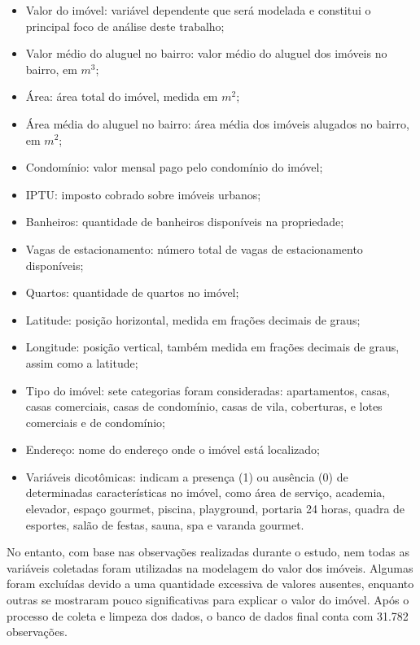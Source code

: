 \documentclass[
  12pt,
  a4paper,
]{scrreprt}
\begin{document}
\begin{itemize}
\item
  Valor do imóvel: variável dependente que será modelada e constitui o
  principal foco de análise deste trabalho;
\item
  Valor médio do aluguel no bairro: valor médio do aluguel dos imóveis
  no bairro, em \(m^3\);
\item
  Área: área total do imóvel, medida em \(m^2\);
\item
  Área média do aluguel no bairro: área média dos imóveis alugados no
  bairro, em \(m^2\);
\item
  Condomínio: valor mensal pago pelo condomínio do imóvel;
\item
  IPTU: imposto cobrado sobre imóveis urbanos;
\item
  Banheiros: quantidade de banheiros disponíveis na propriedade;
\item
  Vagas de estacionamento: número total de vagas de estacionamento
  disponíveis;
\item
  Quartos: quantidade de quartos no imóvel;
\item
  Latitude: posição horizontal, medida em frações decimais de graus;
\item
  Longitude: posição vertical, também medida em frações decimais de
  graus, assim como a latitude;
\item
  Tipo do imóvel: sete categorias foram consideradas: apartamentos,
  casas, casas comerciais, casas de condomínio, casas de vila,
  coberturas, e lotes comerciais e de condomínio;
\item
  Endereço: nome do endereço onde o imóvel está localizado;
\item
  Variáveis dicotômicas: indicam a presença (1) ou ausência (0) de
  determinadas características no imóvel, como área de serviço,
  academia, elevador, espaço gourmet, piscina, playground, portaria 24
  horas, quadra de esportes, salão de festas, sauna, spa e varanda
  gourmet.
\end{itemize}

\vspace{12pt}

No entanto, com base nas observações realizadas durante o estudo, nem
todas as variáveis coletadas foram utilizadas na modelagem do valor dos
imóveis. Algumas foram excluídas devido a uma quantidade excessiva de
valores ausentes, enquanto outras se mostraram pouco significativas para
explicar o valor do imóvel. Após o processo de coleta e limpeza dos
dados, o banco de dados final conta com 31.782 observações.
\end{document}
